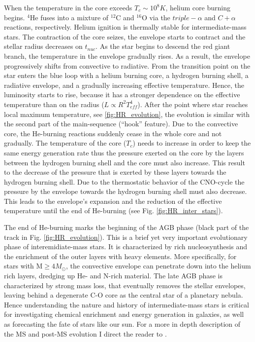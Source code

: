 When the temperature in the core exceeds $T_c \sim 10^8 K$, helium core burning begins. $^4$He fuses into a mixture of $^{12}$C and $^{16
}$O via the $triple- \alpha$ and $C+\alpha$ reactions, respectively. Helium ignition is thermally stable for intermediate-mass stars. The contraction of the core seizes, the envelope starts to contract and the stellar radius decreases on $t_{nuc}$. As the star begins to descend the red giant branch, the temperature in the envelope gradually rises. As a result, the envelope progressively shifts from convective to radiative. From the transition point on the star enters the blue loop with a helium burning core, a hydrogen burning shell, a radiative envelope, and a gradually increasing effective temperature.  Hence, the luminosity starts to rise, because it has a stronger dependence on the effective temperature than on the radius ($L \propto R^2 T_{eff}^4$). After the point where star reaches local maximum temperature, see \cref{fig:HR_evolution}, the evolution is similar with the second part of the main-sequence (``hook'' feature). Due to the convective core, the He-burning reactions suddenly cease in the whole core and not gradually. The temperature of the core ($T_c$) needs to increase in order to keep the same energy generation rate thus the pressure exerted on the core by the layers between the hydrogen burning shell and the core must also increase. This result to the decrease of the pressure that is exerted by these layers towards the hydrogen burning shell. Due to the thermostatic behavior of the CNO-cycle the pressure by the envelope towards the hydrogen burning shell must also decrease. This leads to the envelope's expansion and the reduction of the effective temperature until the end of He-burning (see Fig. \ref{fig:HR_inter_stars}).

The end of He-burning marks the beginning of the AGB phase (black part of the track in Fig. \ref{fig:HR_evolution}). This is a brief yet very important evolutionary phase of interemidiate-mass stars. It is characterized by rich nucleosynthesis and the enrichment of the outer layers with heavy elements. More specifically, for stars with M$ \geq 4M_{\odot}$, the convective envelope can penetrate down into the helium rich layers, dredging up He- and N-rich material. The late AGB phase is characterized by strong mass loss, that eventually removes the stellar envelopes, leaving behind a degenerate C-O core as the central star of a planetary nebula\citep{pols2011stellar}. Hence understanding the nature and history of intermediate-mass stars is critical for investigating chemical enrichment and energy generation in galaxies, as well as forecasting the fate of stars like our sun.  For a more in depth description of the MS and post-MS evolution I direct the reader to \cite{pols2011stellar}.


